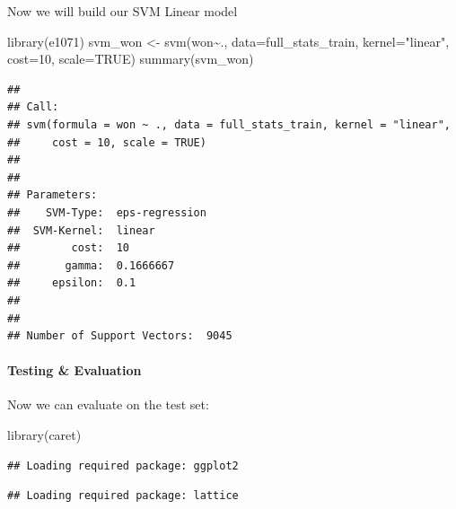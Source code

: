 \documentclass[
]{article}
\newenvironment{Shaded}{\begin{snugshade}}{\end{snugshade}}
\newcommand{\AttributeTok}[1]{\textcolor[rgb]{0.77,0.63,0.00}{#1}}
\newcommand{\ConstantTok}[1]{\textcolor[rgb]{0.00,0.00,0.00}{#1}}
\newcommand{\DecValTok}[1]{\textcolor[rgb]{0.00,0.00,0.81}{#1}}
\newcommand{\FloatTok}[1]{\textcolor[rgb]{0.00,0.00,0.81}{#1}}
\newcommand{\FunctionTok}[1]{\textcolor[rgb]{0.00,0.00,0.00}{#1}}
\newcommand{\NormalTok}[1]{#1}
\newcommand{\OtherTok}[1]{\textcolor[rgb]{0.56,0.35,0.01}{#1}}
\newcommand{\SpecialCharTok}[1]{\textcolor[rgb]{0.00,0.00,0.00}{#1}}
\newcommand{\StringTok}[1]{\textcolor[rgb]{0.31,0.60,0.02}{#1}}
\begin{document}
Now we will build our SVM Linear model

\begin{Shaded}
\begin{Highlighting}[]
\FunctionTok{library}\NormalTok{(e1071)}
\NormalTok{svm\_won }\OtherTok{\textless{}{-}} \FunctionTok{svm}\NormalTok{(won}\SpecialCharTok{\textasciitilde{}}\NormalTok{., }\AttributeTok{data=}\NormalTok{full\_stats\_train, }\AttributeTok{kernel=}\StringTok{"linear"}\NormalTok{, }\AttributeTok{cost=}\DecValTok{10}\NormalTok{, }\AttributeTok{scale=}\ConstantTok{TRUE}\NormalTok{)}
\FunctionTok{summary}\NormalTok{(svm\_won)}
\end{Highlighting}
\end{Shaded}

\begin{verbatim}
## 
## Call:
## svm(formula = won ~ ., data = full_stats_train, kernel = "linear", 
##     cost = 10, scale = TRUE)
## 
## 
## Parameters:
##    SVM-Type:  eps-regression 
##  SVM-Kernel:  linear 
##        cost:  10 
##       gamma:  0.1666667 
##     epsilon:  0.1 
## 
## 
## Number of Support Vectors:  9045
\end{verbatim}

\hypertarget{testing-evaluation}{%
\paragraph{Testing \& Evaluation}\label{testing-evaluation}}

Now we can evaluate on the test set:

\begin{Shaded}
\begin{Highlighting}[]
\FunctionTok{library}\NormalTok{(caret)}
\end{Highlighting}
\end{Shaded}

\begin{verbatim}
## Loading required package: ggplot2
\end{verbatim}

\begin{verbatim}
## Loading required package: lattice
\end{verbatim}

\begin{Shaded}
\end{Shaded}
\end{document}

